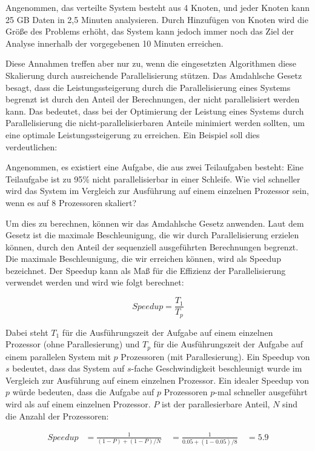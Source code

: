 \begin{itemize}
Angenommen, das verteilte System besteht aus 4 Knoten, und jeder Knoten kann 25 GB Daten in 2,5 Minuten analysieren. Durch Hinzufügen von Knoten wird die Größe des Problems erhöht, das System kann jedoch immer noch das Ziel der Analyse innerhalb der vorgegebenen 10 Minuten erreichen.

Diese Annahmen treffen aber nur zu, wenn die eingesetzten Algorithmen diese Skalierung durch ausreichende Parallelisierung stützen. Das Amdahlsche Gesetz~\cite{amdahl1967validity} besagt, dass die Leistungssteigerung durch die Parallelisierung eines Systems begrenzt ist durch den Anteil der Berechnungen, der nicht parallelisiert werden kann. Das bedeutet, dass bei der Optimierung der Leistung eines Systems durch Parallelisierung die nicht-parallelisierbaren Anteile minimiert werden sollten, um eine optimale Leistungssteigerung zu erreichen. Ein Beispiel soll dies verdeutlichen:

Angenommen, es existiert eine Aufgabe, die aus zwei Teilaufgaben besteht: Eine Teilaufgabe ist zu 95\% nicht parallelisierbar in einer Schleife. Wie viel schneller wird das System im Vergleich zur Ausführung auf einem einzelnen Prozessor sein, wenn es auf 8 Prozessoren skaliert?

Um dies zu berechnen, können wir das Amdahlsche Gesetz anwenden. Laut dem Gesetz ist die maximale Beschleunigung, die wir durch Parallelisierung erzielen können, durch den Anteil der sequenziell ausgeführten Berechnungen begrenzt. 
Die maximale Beschleunigung, die wir erreichen können, wird als Speedup bezeichnet. Der Speedup kann als Maß für die Effizienz der Parallelisierung verwendet werden und wird wie folgt berechnet:

\begin{equation*}
Speedup = \frac{T_1}{T_p}
\end{equation*}

Dabei steht $T_1$ für die Ausführungszeit der Aufgabe auf einem einzelnen Prozessor (ohne Parallesierung) und $T_p$ für die Ausführungszeit der Aufgabe auf einem parallelen System mit $p$ Prozessoren (mit Parallesierung). Ein Speedup von $s$ bedeutet, dass das System auf $s$-fache Geschwindigkeit beschleunigt wurde im Vergleich zur Ausführung auf einem einzelnen Prozessor. Ein idealer Speedup von $p$ würde bedeuten, dass die Aufgabe auf $p$ Prozessoren $p$-mal schneller ausgeführt wird als auf einem einzelnen Prozessor. $P$ ist der parallesierbare Anteil, $N$ sind die Anzahl der Prozessoren:

\begin{align*}
Speedup &= \frac{1}{(1 - P) + (1 - P)/N} \
&= \frac{1}{0.05 + (1 - 0.05)/8} \
&= 5.9
\end{align*}


\end{itemize}
